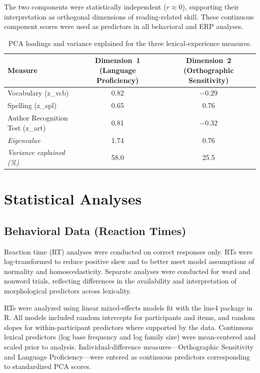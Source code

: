 \documentclass[preprint,12pt, authoryear, review]{elsarticle}
\begin{document}
The two components were statistically independent ($r \approx 0$), supporting their interpretation as orthogonal dimensions of reading-related skill. These continuous component scores were used as predictors in all behavioral and ERP analyses.


\begin{table}[ht]
	\centering
	\caption{PCA loadings and variance explained for the three lexical-experience measures.}
	\label{tab:pca_loadings}
	\begin{tabular}{lcc}
		\toprule
		\textbf{Measure} & \textbf{Dimension~1 (Language Proficiency)} & \textbf{Dimension~2 (Orthographic Sensitivity)} \\
		\midrule
		Vocabulary (z\_vcb) & 0.82 & $-0.29$ \\
		Spelling (z\_spl) & 0.65 & 0.76 \\
		Author Recognition Test (z\_art) & 0.81 & $-0.32$ \\
		\midrule
		\textit{Eigenvalue} & 1.74 & 0.76 \\
		\textit{Variance explained (\%)} & 58.0 & 25.5 \\
		\bottomrule
	\end{tabular}
\end{table}

\section{Statistical Analyses}

	\subsection{Behavioral Data (Reaction Times)}
	Reaction time (RT) analyses were conducted on correct responses only. RTs were log-transformed to reduce positive skew and to better meet model assumptions of normality and homoscedasticity. Separate analyses were conducted for word and nonword trials, reflecting differences in the availability and interpretation of morphological predictors across lexicality.
	
	RTs were analyzed using linear mixed-effects models fit with the lme4 package in R. All models included random intercepts for participants and items, and random slopes for within-participant predictors where supported by the data. Continuous lexical predictors (log base frequency and log family size) were mean-centered and scaled prior to analysis. Individual-difference measures—Orthographic Sensitivity and Language Proficiency—were entered as continuous predictors corresponding to standardized PCA scores.
	
\end{document}
